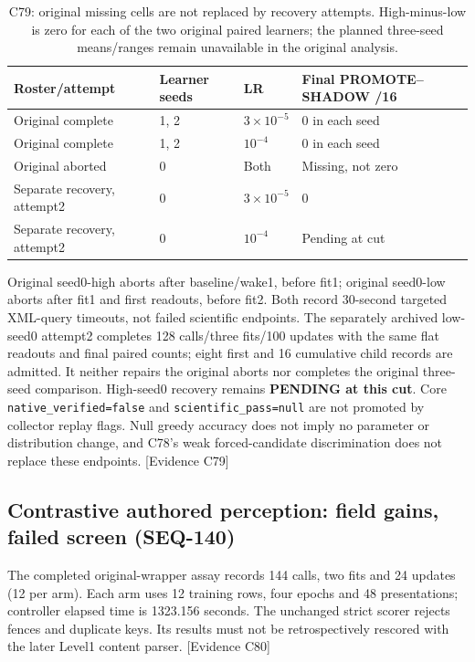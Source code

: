 \documentclass{article}
\begin{document}
\begin{table}[htbp]
\centering\small
\begin{tabular}{llll}
\toprule
Roster/attempt & Learner seeds & LR & Final PROMOTE--SHADOW /16 \\
\midrule
Original complete & 1, 2 & $3\times10^{-5}$ & 0 in each seed \\
Original complete & 1, 2 & $10^{-4}$ & 0 in each seed \\
Original aborted & 0 & Both & Missing, not zero \\
Separate recovery, attempt2 & 0 & $3\times10^{-5}$ & 0 \\
Separate recovery, attempt2 & 0 & $10^{-4}$ & Pending at cut \\
\bottomrule
\end{tabular}
\caption{C79: original missing cells are not replaced by recovery attempts.
High-minus-low is zero for each of the two original paired learners; the planned
three-seed means/ranges remain unavailable in the original analysis.}
\label{tab:bounded-lr}
\end{table}

Original seed0-high aborts after baseline/wake1, before fit1; original seed0-low
aborts after fit1 and first readouts, before fit2. Both record 30-second targeted
XML-query timeouts, not failed scientific endpoints. The separately archived
low-seed0 attempt2 completes 128 calls/three fits/100 updates with the same flat
readouts and final paired counts; eight first and 16 cumulative child records
are admitted. It neither repairs the original aborts nor completes the original
three-seed comparison. High-seed0 recovery remains \textbf{PENDING at this cut}.
Core \texttt{native\_verified=false} and \texttt{scientific\_pass=null} are not
promoted by collector replay flags. Null greedy accuracy does not imply no
parameter or distribution change, and C78's weak forced-candidate discrimination
does not replace these endpoints. \textsf{[Evidence C79]}

\subsection{Contrastive authored perception: field gains, failed screen (SEQ-140)}
\label{sec:bounded-contrastive}
The completed original-wrapper assay records 144 calls, two fits and 24 updates
(12 per arm). Each arm uses 12 training rows, four epochs and 48 presentations;
controller elapsed time is 1323.156 seconds. The unchanged strict scorer rejects
fences and duplicate keys. Its results must not be retrospectively rescored with
the later Level1 content parser. \textsf{[Evidence C80]}
\end{document}
